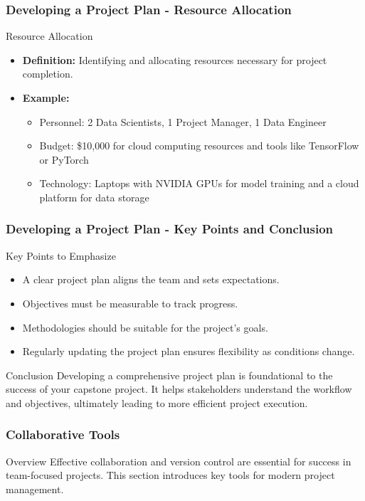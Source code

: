 \documentclass[aspectratio=169]{beamer}
\begin{document}
\begin{frame}[fragile]
    \frametitle{Developing a Project Plan - Resource Allocation}
    \begin{block}{Resource Allocation}
        \begin{itemize}
            \item \textbf{Definition:} Identifying and allocating resources necessary for project completion.
            \item \textbf{Example:} 
            \begin{itemize}
                \item Personnel: 2 Data Scientists, 1 Project Manager, 1 Data Engineer
                \item Budget: \$10,000 for cloud computing resources and tools like TensorFlow or PyTorch
                \item Technology: Laptops with NVIDIA GPUs for model training and a cloud platform for data storage
            \end{itemize}
        \end{itemize}
    \end{block}
\end{frame}

\begin{frame}[fragile]
    \frametitle{Developing a Project Plan - Key Points and Conclusion}
    \begin{block}{Key Points to Emphasize}
        \begin{itemize}
            \item A clear project plan aligns the team and sets expectations.
            \item Objectives must be measurable to track progress.
            \item Methodologies should be suitable for the project's goals.
            \item Regularly updating the project plan ensures flexibility as conditions change.
        \end{itemize}
    \end{block}
    \begin{block}{Conclusion}
        Developing a comprehensive project plan is foundational to the success of your capstone project. 
        It helps stakeholders understand the workflow and objectives, ultimately leading to more efficient project execution.
    \end{block}
\end{frame}

\begin{frame}[fragile]
    \frametitle{Collaborative Tools}
    \begin{block}{Overview}
        Effective collaboration and version control are essential for success in team-focused projects. This section introduces key tools for modern project management.
    \end{block}
\end{frame}
\end{document}
